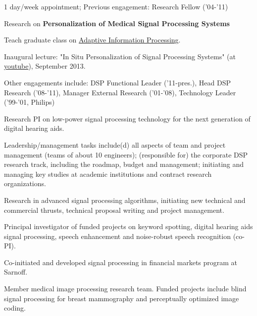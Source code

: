 

 
\vspace{-.8cm}
\begin{items}
  \item 1 day/week appointment; Previous engagement: Research Fellow ('04-'11)
  \item Research on \textbf{Personalization of Medical Signal Processing Systems}
  \item Teach graduate class on \href{http://www.sps.ele.tue.nl/members/b.vries/teaching/5mb20/index.html}{Adaptive Information Processing}.
  \item Inaugural lecture: "In Situ Personalization of Signal Processing Systems" (at \href{http://goo.gl/EoU0SE}{youtube}), September 2013. 
\end{items}


 
\vspace{-.8cm}
\begin{items}
  \item Other engagements include: DSP Functional Leader ('11-pres.), Head DSP Research ('08-'11), Manager External Research ('01-'08), Technology Leader ('99-'01, Philips)
  \item Research PI on low-power signal processing technology for the next
generation of digital hearing aids.
  \item Leadership/management tasks include(d) all aspects
of team and project management (teams of about 10 engineers); (responsible for) the corporate DSP research track, including the roadmap, budget and management; initiating and managing key studies at academic institutions and contract research organizations.
\end{items}




  
\vspace{-.8cm}
\begin{items}
\item Research in advanced signal processing algorithms, initiating new technical and commercial thrusts, technical proposal writing and project management.
\item Principal investigator of funded projects on keyword spotting, digital hearing aids signal processing, speech enhancement and noise-robust speech recognition (co-PI). 
\item Co-initiated and developed signal processing in financial markets program at Sarnoff.
\item Member medical image processing research team. Funded projects include blind signal processing for breast mammography and perceptually optimized image coding.
\end{items}

